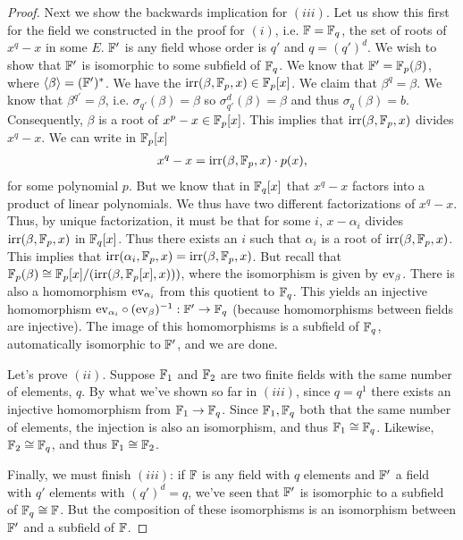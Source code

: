 \documentclass{../mathnotes}
\begin{document}
\begin{proof}
    Next we show the backwards implication for $(iii)$. Let us show this first for the field we constructed in the proof for $(i)$, i.e. $\mathbb{F}=\mathbb{F}_q$,
    the set of roots of $x^q-x$ in some $E$. $\mathbb{F}'$ is any field whose order is $q'$ and $q=(q')^d$. We wish to show that $\mathbb{F}'$ is isomorphic to some
    subfield of $\mathbb{F}_q$. We know that $\mathbb{F}'=\mathbb{F}_p(\beta)$, where $\langle\beta\rangle=(\mathbb{F}')^*$. We have the $\operatorname{irr}(\beta,\mathbb{F}_p,x)\in\mathbb{F}_p[x]$. We claim that
    $\beta^q=\beta$. We know that $\beta^{q'}=\beta$, i.e. $\sigma_{q'}(\beta)=\beta$ so $\sigma_{q'}^d(\beta)=\beta$ and thus $\sigma_q(\beta)=b$.
    Consequently, $\beta$ is a root of $x^p-x\in \mathbb{F}_p[x]$. This implies that $\operatorname{irr}(\beta,\mathbb{F}_p,x)$ divides $x^q-x$. We can write in $\mathbb{F}_p[x]$
    \begin{align*}
        x^q-x=\operatorname{irr}(\beta,\mathbb{F}_p,x)\cdot p(x),
    \end{align*}
    for some polynomial $p$. But we know that in $\mathbb{F}_q[x]$ that $x^q-x$ factors into a product of linear polynomials. We thus have two different factorizations
    of $x^q-x$. Thus, by unique factorization, it must be that for some $i$, $x-\alpha_i$ divides $\operatorname{irr}(\beta,\mathbb{F}_p,x)$ in $\mathbb{F}_q[x]$.
    Thus there exists an $i$ such that $\alpha_i$ is a root of $\operatorname{irr}(\beta,\mathbb{F}_p,x)$. This implies that $\operatorname{irr}(\alpha_i,\mathbb{F}_p,x)=\operatorname{irr}(\beta,\mathbb{F}_p,x)$.
    But recall that $\mathbb{F}_p(\beta)\cong\mathbb{F}_p[x]/(\operatorname{irr}(\beta,\mathbb{F}_p[x],x)))$, where the isomorphism is given by ${\rm ev}_{\beta}$. There is also
    a homomorphism ${\rm ev}_{\alpha_i}$ from this quotient to $\mathbb{F}_q$. This yields an injective homomorphism ${\rm ev}_{\alpha_i}\circ ({\rm ev}_\beta)^{-1}:\mathbb{F}'\to\mathbb{F}_q$
    (because homomorphisms between fields are injective). The image of this homomorphisms is a subfield of $\mathbb{F}_q$, automatically isomorphic to $\mathbb{F}'$, and we are done.

    Let's prove $(ii)$. Suppose $\mathbb{F}_1$ and $\mathbb{F}_2$ are two finite fields with the same number of elements, $q$. By what we've shown so far in $(iii)$, since
    $q=q^1$ there exists an injective homomorphism from $\mathbb{F}_1\to\mathbb{F}_q$. Since $\mathbb{F}_1,\mathbb{F}_q$ both that the same number of elements, the injection is also
    an isomorphism, and thus $\mathbb{F}_1\cong \mathbb{F}_q$. Likewise, $\mathbb{F}_2\cong \mathbb{F}_q$, and thus $\mathbb{F}_1\cong\mathbb{F}_2$.

    Finally, we must finish $(iii)$: if $\mathbb{F}$ is any field with $q$ elements and $\mathbb{F}'$ a field with $q'$ elements with $(q')^d=q$, we've seen that
    $\mathbb{F}'$ is isomorphic to a subfield of $\mathbb{F}_q\cong\mathbb{F}$. But the composition of these isomorphisms is an isomorphism between $\mathbb{F}'$ and a subfield of $\mathbb{F}$.
\end{proof}
\end{document}
